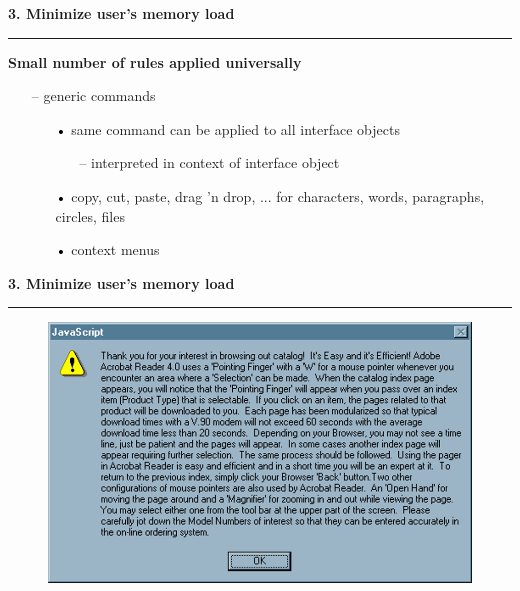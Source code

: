 \documentclass[pdf]{beamer}
\begin{document}
\begin{frame}
{\textbf{3. Minimize user's memory load}}{\textcolor{red}{\rule{12cm}{1.2pt}}}

    \textbf{Small number of rules applied universally}
     \begin{itemize}
      \item[--] generic commands
      \begin{itemize}
        	\item[\textcolor{black}{•}] same command can be applied to all 					interface objects
            \begin{itemize}
      			\item[--] interpreted in context of interface object
                \newline
            \end{itemize}
			\item[\textcolor{black}{•}] copy, cut, paste, drag ’n drop, 			... for characters, words, paragraphs, circles, files
               \newline
			\item[\textcolor{black}{•}] context menus
      \end{itemize}
    \end{itemize}
    
\end{frame}



\begin{frame}
{\textbf{3. Minimize user's memory load}}{\textcolor{red}{\rule{12cm}{1.2pt}}}

	\begin{figure}
		\includegraphics[scale=0.5]{19_picture.png}
  	\end{figure}
    
\end{frame}
\end{document}
